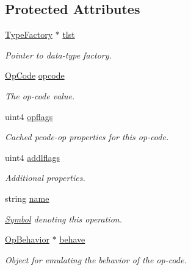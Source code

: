 \subsection*{Protected Attributes}
\begin{DoxyCompactItemize}
\item 
\mbox{\hyperlink{class_type_factory}{Type\+Factory}} $\ast$ \mbox{\hyperlink{class_type_op_a06a48c0a8067e447395c9ccf8e1a8b5c}{tlst}}
\begin{DoxyCompactList}\small\item\em Pointer to data-\/type factory. \end{DoxyCompactList}\item 
\mbox{\hyperlink{opcodes_8hh_abeb7dfb0e9e2b3114e240a405d046ea7}{Op\+Code}} \mbox{\hyperlink{class_type_op_a4cf1a87808c695547bea14f3dc84404c}{opcode}}
\begin{DoxyCompactList}\small\item\em The op-\/code value. \end{DoxyCompactList}\item 
uint4 \mbox{\hyperlink{class_type_op_aeb09cfb426122a00d1476e3b8642f1a9}{opflags}}
\begin{DoxyCompactList}\small\item\em Cached pcode-\/op properties for this op-\/code. \end{DoxyCompactList}\item 
uint4 \mbox{\hyperlink{class_type_op_a30b56e550e24236241d2a44dce290331}{addlflags}}
\begin{DoxyCompactList}\small\item\em Additional properties. \end{DoxyCompactList}\item 
string \mbox{\hyperlink{class_type_op_a1b6f0e6b45be588062370b446d9abc4a}{name}}
\begin{DoxyCompactList}\small\item\em \mbox{\hyperlink{class_symbol}{Symbol}} denoting this operation. \end{DoxyCompactList}\item 
\mbox{\hyperlink{class_op_behavior}{Op\+Behavior}} $\ast$ \mbox{\hyperlink{class_type_op_acc806d7bbd5997fb998e83df32bcbbc1}{behave}}
\begin{DoxyCompactList}\small\item\em Object for emulating the behavior of the op-\/code. \end{DoxyCompactList}\end{DoxyCompactItemize}


